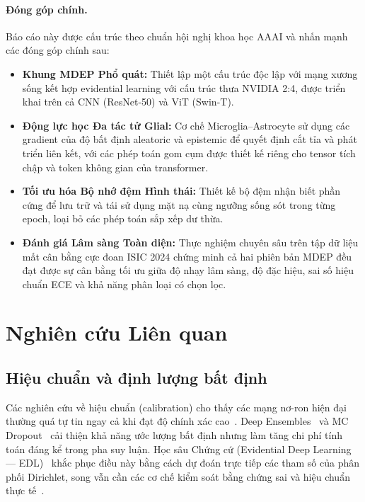 \documentclass[11pt, a4paper]{article}
\begin{document}
\paragraph{Đóng góp chính.} Báo cáo này được cấu trúc theo chuẩn hội nghị khoa học AAAI và nhấn mạnh các đóng góp chính sau:
\begin{itemize}
    \item \textbf{Khung MDEP Phổ quát:} Thiết lập một cấu trúc độc lập với mạng xương sống kết hợp evidential learning với cấu trúc thưa NVIDIA 2:4, được triển khai trên cả CNN (ResNet-50) và ViT (Swin-T).
    \item \textbf{Động lực học Đa tác tử Glial:} Cơ chế Microglia--Astrocyte sử dụng các gradient của độ bất định aleatoric và epistemic để quyết định cắt tỉa và phát triển liên kết, với các phép toán gom cụm được thiết kế riêng cho tensor tích chập và token không gian của transformer.
    \item \textbf{Tối ưu hóa Bộ nhớ đệm Hình thái:} Thiết kế bộ đệm nhận biết phần cứng để lưu trữ và tái sử dụng mặt nạ cùng ngưỡng sống sót trong từng epoch, loại bỏ các phép toán sắp xếp dư thừa.
    \item \textbf{Đánh giá Lâm sàng Toàn diện:} Thực nghiệm chuyên sâu trên tập dữ liệu mất cân bằng cực đoan ISIC 2024 chứng minh cả hai phiên bản MDEP đều đạt được sự cân bằng tối ưu giữa độ nhạy lâm sàng, độ đặc hiệu, sai số hiệu chuẩn ECE và khả năng phân loại có chọn lọc.
\end{itemize}

\section{Nghiên cứu Liên quan}\label{sec:related}

\subsection{Hiệu chuẩn và định lượng bất định}
Các nghiên cứu về hiệu chuẩn (calibration) cho thấy các mạng nơ-ron hiện đại thường quá tự tin ngay cả khi đạt độ chính xác cao~\cite{guo2017calibration, minderer2021revisiting}. Deep Ensembles~\cite{lakshminarayanan2017simple} và MC Dropout~\cite{gal2016dropout} cải thiện khả năng ước lượng bất định nhưng làm tăng chi phí tính toán đáng kể trong pha suy luận. Học sâu Chứng cứ (Evidential Deep Learning --- EDL)~\cite{sensoy2018evidential} khắc phục điều này bằng cách dự đoán trực tiếp các tham số của phân phối Dirichlet, song vẫn cần các cơ chế kiểm soát bằng chứng sai và hiệu chuẩn thực tế~\cite{shen2024mirage}.
\end{document}
